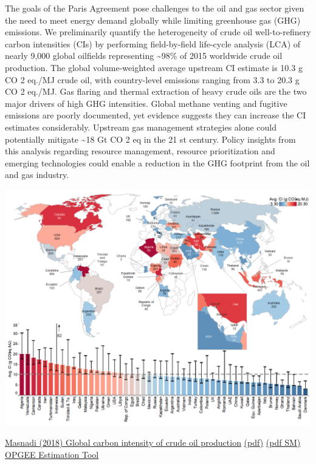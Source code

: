 \documentclass[
]{book}
\begin{document}
The goals of the Paris Agreement pose challenges
to the oil and gas sector given the need to meet energy demand globally while limiting
greenhouse gas (GHG) emissions. We preliminarily quantify the heterogeneity of crude oil
well-to-refinery carbon intensities (CIs) by performing field-by-field life-cycle analysis
(LCA) of nearly 9,000 global oilfields representing \textasciitilde98\% of 2015 worldwide crude oil
production. The global volume-weighted average upstream CI estimate is 10.3 g
CO 2 eq./MJ crude oil, with country-level emissions ranging from 3.3 to 20.3 g CO 2 eq./MJ.
Gas flaring and thermal extraction of heavy crude oils are the two major drivers of high
GHG intensities. Global methane venting and fugitive emissions are poorly documented,
yet evidence suggests they can increase the CI estimates considerably. Upstream gas
management strategies alone could potentially mitigate \textasciitilde18 Gt CO 2 eq in the 21 st century.
Policy insights from this analysis regarding resource management, resource prioritization
and emerging technologies could enable a reduction in the GHG footprint from the oil and
gas industry.

\includegraphics{fig/carbon_intensity_of_crude_oil_production.png}

\href{https://www.osti.gov/pages/biblio/1485127}{Masnadi (2018) Global carbon intensity of crude oil production}
\href{pdf/Masnadi_2018_Carbon_Intensity_of_Crude_Oil_Production.pdf}{(pdf)}
\href{pdf/Masnadi_2018_Carbon_Intensity_of_Crude_Oil_Production_SM.pdf}{(pdf SM)}
\href{https://eao.stanford.edu/research-areas/opgeehttps://eao.stanford.edu/research-areas/opgee}{OPGEE Estimation Tool}
\end{document}
